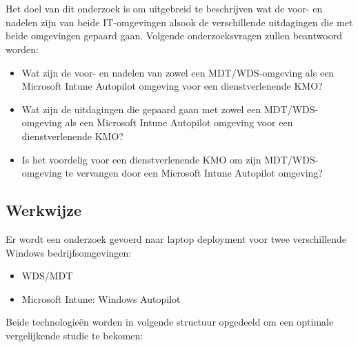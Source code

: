 
\chapter{}
\label{ch:methodologie}


Het doel van dit onderzoek is om uitgebreid te beschrijven wat de voor- en nadelen zijn van beide IT-omgevingen alsook de verschillende uitdagingen die met beide omgevingen gepaard gaan. Volgende onderzoeksvragen zullen beantwoord worden:

\begin{itemize}
    \item Wat zijn de voor- en nadelen van zowel een MDT/WDS-omgeving als een Microsoft Intune Autopilot omgeving voor een dienstverlenende KMO?
    \item Wat zijn de uitdagingen die gepaard gaan met zowel een MDT/WDS-omgeving als een Microsoft Intune Autopilot omgeving voor een dienstverlenende KMO?
    \item Is het voordelig voor een dienstverlenende KMO om zijn MDT/WDS-omgeving te vervangen door een Microsoft Intune Autopilot omgeving?
\end{itemize}

\section{Werkwijze}
Er wordt een onderzoek gevoerd naar laptop deployment voor twee verschillende Windows bedrijfsomgevingen:

\begin{itemize}
    \item WDS/MDT
    \item Microsoft Intune: Windows Autopilot
\end{itemize}

Beide technologieën worden in volgende structuur opgedeeld om een optimale vergelijkende studie te bekomen:

